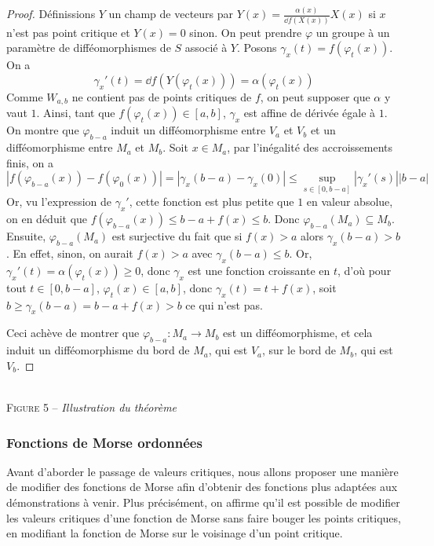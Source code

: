 \begin{proof}
    Définissions $Y$ un champ de vecteurs par $Y(x)=\frac{\alpha(x)}{\dd f(X(x))}X(x)$ si 
    $x$ n'est pas point critique et $Y(x)=0$ sinon.
    On peut prendre $\varphi$ un groupe à un paramètre de difféomorphismes de $S$ associé à 
    $Y$. 
    Posons $\gamma_x(t)=f(\varphi_t(x))$.
    On a 
    \[
        \gamma_x'(t)=\dd f(Y(\varphi_t(x)))=\alpha(\varphi_t(x))
    \]
    Comme $W_{a,b}$ ne contient pas de points critiques de $f$, on peut supposer que $\alpha$ 
    y vaut $1$.
    Ainsi, tant que $f(\varphi_t(x))\in[a,b]$, $\gamma_x$ est affine de dérivée égale à $1$.
    On montre que $\varphi_{b-a}$ induit un difféomorphisme entre $V_a$ et $V_b$ et un 
    difféomorphisme entre $M_a$ et $M_b$. 
    Soit $x\in M_a$, par l'inégalité des accroissements finis, on a 
    \[
        |f(\varphi_{b-a}(x))-f(\varphi_0(x))|=
        |\gamma_x(b-a)-\gamma_x(0)|\leq \sup_{s\in[0,b-a]}|\gamma_x'(s)||b-a|
    \]
    Or, vu l'expression de $\gamma_x'$, cette fonction est plus petite que $1$ en valeur absolue, 
    on en déduit que $f(\varphi_{b-a}(x))\leq b-a+f(x)\leq b$.
    Donc $\varphi_{b-a}(M_a)\subseteq M_b$. 
    Ensuite, $\varphi_{b-a}(M_a)$ est surjective du fait que si $f(x)>a$ alors $\gamma_x(b-a)>b$. 
    En effet, sinon, on aurait $f(x)>a$ avec $\gamma_x(b-a)\leq b$. 
    Or, $\gamma_x'(t)=\alpha(\varphi_t(x))\geq 0$,
    donc $\gamma_x$ est une fonction croissante en $t$, d'où pour tout $t\in[0,b-a]$, 
    $\varphi_t(x)\in[a,b]$, donc $\gamma_x(t)=t+f(x)$, soit $b\geq \gamma_x(b-a)=b-a+f(x)>b$ 
    ce qui n'est pas.

    Ceci achève de montrer que $\varphi_{b-a}:M_a\to M_b$ est un difféomorphisme, et cela 
    induit un difféomorphisme du bord de $M_a$, qui est $V_a$, sur le bord de $M_b$, qui est $V_b$.
\end{proof}

\begin{center}
    \\
    \textsc{Figure 5} – \textit{Illustration du théorème}
\end{center}

\subsubsection{Fonctions de Morse ordonnées}

Avant d'aborder le passage de valeurs critiques, nous allons proposer 
une manière de modifier des fonctions de Morse afin d'obtenir des
fonctions plus adaptées aux démonstrations à venir. 
Plus précisément, on affirme qu'il est possible de modifier les valeurs
critiques d'une fonction de Morse sans faire bouger les points critiques,
en modifiant la fonction de Morse sur le voisinage d'un point critique.

